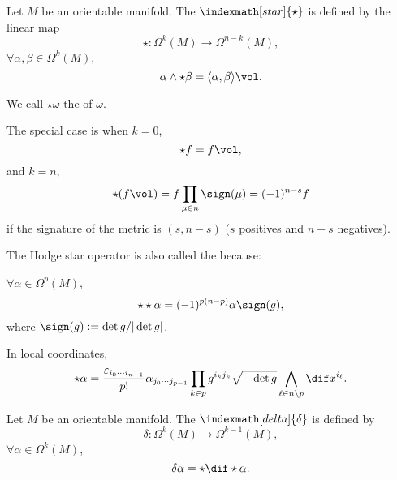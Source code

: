 \documentclass[openany, oneside, a5paper]{book}
\begin{document}
\begin{definition}
    Let $M$ be an orientable manifold.
    The  $\indexmath[star]{\star}$ is defined by the linear map
    \begin{equation}
        \star \colon \Omega^k(M) \to \Omega^{n - k}(M),
    \end{equation}
    $\forall \alpha, \beta \in \Omega^k(M)$,
    \begin{equation}
        \alpha \wedge \star \beta = \langle \alpha, \beta \rangle \vol.
    \end{equation}
    
    We call $\star \omega$ the  of $\omega$.
\end{definition}

The special case is when $k = 0$,
\begin{equation}
    \star f = f \vol,
\end{equation}
and $k = n$,
\begin{equation}
    \star (f \vol) = f \prod_{\mu \in n} \sign(\mu) = (-1)^{n - s} f
\end{equation}
if the signature of the metric is $(s, n - s)$ ($s$ positives and $n - s$ negatives).

The Hodge star operator is also called the  because:
\begin{theorem}\label{theorem: hodge duality}
    $\forall \alpha \in \Omega^p(M)$,
    \begin{equation}
        \star \star \alpha = (-1)^{p(n - p)} \alpha\sign(g),
    \end{equation}
    where $\sign(g) := \det g / |\det g|$.
\end{theorem}

In local coordinates, 
\begin{equation}
    \star \alpha 
        = \frac {\varepsilon_{i_0\cdots i_{n - 1}}} {p!}
            \alpha_{j_0 \cdots j_{p - 1}}\prod_{k \in p} g^{i_k j_k}
            \sqrt{- \det g} \bigwedge_{\ell \in n \backslash p} \dif x^{i_\ell}.
\end{equation}

\begin{definition}[Codifferential]
    Let $M$ be an orientable manifold.
    The  $\indexmath[delta]{\delta}$ is defined by
    \begin{equation}
        \delta \colon \Omega^k(M) \to \Omega^{k - 1}(M),
    \end{equation}
    $\forall \alpha \in \Omega^k(M)$,
    \begin{equation}
        \delta \alpha = \star \dif \star \alpha.
    \end{equation}
    
\end{definition}
\end{document}
